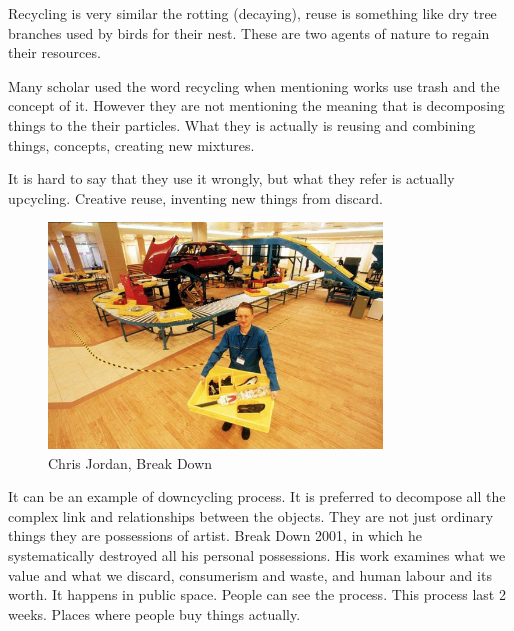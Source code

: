 Recycling is very similar the rotting (decaying), reuse is something like dry tree branches used by birds for their nest. These are two agents of nature to regain their resources.

Many scholar used the word recycling when mentioning works use trash and the concept of it. However they are not mentioning the meaning that is decomposing things to the their particles. What they is actually is reusing and combining things, concepts, creating new mixtures.

It is hard to say that they use it wrongly, but what they refer is actually upcycling. Creative reuse, inventing new things from discard.


\begin{figure}[h!]
  \centering
  \includegraphics[height=6cm]{graphics/ChrisJordan_BreakDown.jpg}
  \caption{Chris Jordan, Break Down}
  \label{fig:ChrisJordan_BreakDown}
\end{figure}

 It can be an example of downcycling process. It is preferred to decompose all the complex link and relationships between the objects. They are not just ordinary things they are possessions of artist. Break Down 2001, in which he systematically destroyed all his personal possessions. His work examines what we value and what we discard, consumerism and waste, and human labour and its worth. It happens in public space. People can see the process. This process last 2 weeks. Places where people buy things actually.


